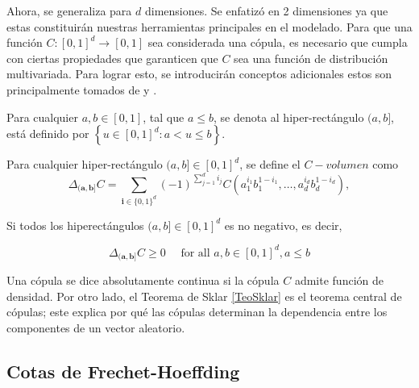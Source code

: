 
Ahora, se generaliza para $d$ dimensiones. Se enfatizó en 2 dimensiones ya que estas constituirán nuestras herramientas principales en el modelado. Para que una función $C: [0, 1]^d \to [0, 1]$ sea considerada una cópula, es necesario que cumpla con ciertas propiedades que garanticen que $C$ sea una función de distribución multivariada. Para lograr esto, se introducirán conceptos adicionales estos son principalmente tomados de \cite{nelsenintroduction} y \cite{TesisEmanuel}.

\begin{defn}
    Para cualquier $a, b \in [0, 1]$, tal que $a \leq b$, se denota al hiper-rectángulo $(a, b]$, está definido por $\left\{ u \in [0, 1]^{d}: a <u \leq b\right\}$.
\end{defn}

\begin{defn}
    Para cualquier hiper-rectángulo $(a, b] \in [0, 1]^d$, se define el $C-volumen$ como
    \begin{equation}
        \Delta_{(\boldsymbol{a}, \boldsymbol{b}]} C=\sum_{\boldsymbol{i} \in\{0,1\}^d}(-1)^{\sum_{j=1}^d i_j} C\left(a_1^{i_1} b_1^{1-i_1}, \ldots, a_d^{i_d} b_d^{1-i_d}\right),
    \end{equation}
\end{defn}

Si todos los hiperectángulos $(a, b] \in [0, 1]^d$ es no negativo, es decir, 

\begin{equation}
    \Delta_{(\boldsymbol{a}, \boldsymbol{b}]} C \geq 0 \quad \text { for all } a, b \in[0,1]^d, a \leq b
\end{equation}

Una cópula se dice absolutamente continua si la cópula $C$ admite función de densidad. Por otro lado, el Teorema de Sklar \ref{TeoSklar} es el teorema central de cópulas; este explica por qué las cópulas determinan la dependencia entre los componentes de un vector aleatorio.



\subsection{Cotas de Frechet-Hoeffding}

